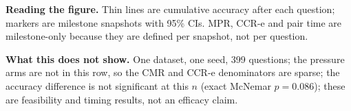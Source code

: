 \vspace{1em}
\textbf{Reading the figure.} Thin lines are cumulative accuracy after each question; markers are milestone snapshots with 95\% CIs. MPR, CCR-e and pair time are milestone-only because they are defined per snapshot, not per question.

\textbf{What this does not show.} One dataset, one seed, 399 questions; the pressure arms are not in this row, so the CMR and CCR-e denominators are sparse; the accuracy difference is not significant at this $n$ (exact McNemar $p=0.086$); these are feasibility and timing results, not an efficacy claim.
